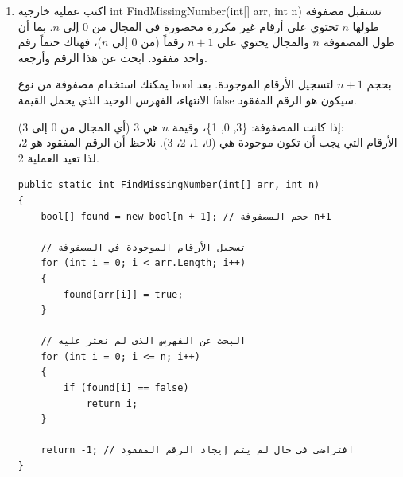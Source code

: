 \documentclass[14pt]{extarticle}
\begin{document}
\begin{enumerate}[itemsep=2em]
\begin{boxSolution}
\begin{english}
\begin{verbatim}
    // 1. بناء مصفوفة التكرار
    for (int i = 0; i < arr.Length; i++)
    {
        freq[arr[i]]++;
    }

    // 2. إعادة كتابة المصفوفة الأصلية
    int index = 0;
    for (int i = 0; i < freq.Length; i++)
    {
        while (freq[i] > 0)
        {
            arr[index] = i;
            index++;
            freq[i]--;
        }
    }
}
    \end{verbatim}
    \end{english}
    \end{boxSolution}
    \clearpage
    \fi


    \item
    اكتب عملية خارجية \textenglish{int FindMissingNumber(int[] arr, int n)} تستقبل مصفوفة طولها $n$ تحتوي على أرقام غير مكررة محصورة في المجال من 0 إلى $n$. بما أن طول المصفوفة $n$ والمجال يحتوي على $n+1$ رقماً (من 0 إلى $n$)، فهناك حتماً رقم واحد مفقود. ابحث عن هذا الرقم وأرجعه.

    \begin{boxHint}
    يمكنك استخدام مصفوفة من نوع \textenglish{bool} بحجم $n+1$ لتسجيل الأرقام الموجودة. بعد الانتهاء، الفهرس الوحيد الذي يحمل القيمة \textenglish{false} سيكون هو الرقم المفقود.
    \end{boxHint}

    \begin{boxExample}
    إذا كانت المصفوفة: \textenglish{\{3, 0, 1\}}، وقيمة $n$ هي 3 (أي المجال من 0 إلى 3): \\
    الأرقام التي يجب أن تكون موجودة هي (0، 1، 2، 3). نلاحظ أن الرقم المفقود هو 2، لذا تعيد العملية 2.
    \end{boxExample}

    \ifwithsols
    \begin{boxSolution}
    \begin{english}
    \begin{verbatim}
public static int FindMissingNumber(int[] arr, int n)
{
    bool[] found = new bool[n + 1]; // حجم المصفوفة n+1

    // تسجيل الأرقام الموجودة في المصفوفة
    for (int i = 0; i < arr.Length; i++)
    {
        found[arr[i]] = true;
    }

    // البحث عن الفهرس الذي لم نعثر عليه
    for (int i = 0; i <= n; i++)
    {
        if (found[i] == false)
            return i;
    }

    return -1; // افتراضي في حال لم يتم إيجاد الرقم المفقود
}
    \end{verbatim}
    \end{english}
    \end{boxSolution}
    \clearpage
    \fi

\end{enumerate}
\end{document}

